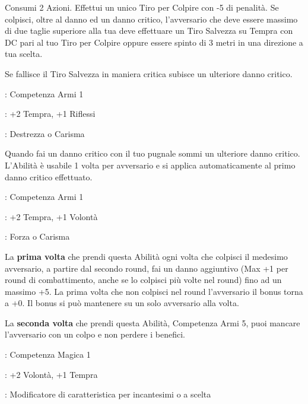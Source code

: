 \begin{multicols}{2}
Consumi 2 Azioni. Effettui un unico Tiro per Colpire con -5 di penalità.
Se colpisci, oltre al danno ed un danno critico, l'avversario che deve essere massimo di due taglie superiore alla tua deve effettuare un Tiro Salvezza su Tempra con DC pari al tuo Tiro per Colpire oppure essere spinto di 3 metri in una direzione a tua scelta.

Se fallisce il Tiro Salvezza in maniera critica subisce un ulteriore danno critico.

\begin{description}[noitemsep, topsep=0pt, parsep=0pt, partopsep=0pt, leftmargin=0cm, labelwidth=2.5cm]
    \item[\textbf{Requisito}]: Competenza Armi 1
    \item[\textbf{Tiri Salvezza}]: +2 Tempra, +1 Riflessi
    \item[\textbf{Caratteristica}]: Destrezza o Carisma
\end{description}

Quando fai un danno critico con il tuo pugnale sommi un ulteriore danno critico. L'Abilità è usabile 1 volta per avversario e si applica automaticamente al primo danno critico effettuato.

\begin{description}[noitemsep, topsep=0pt, parsep=0pt, partopsep=0pt, leftmargin=0cm, labelwidth=2.5cm]
    \item[\textbf{Requisito}]: Competenza Armi 1
    \item[\textbf{Tiri Salvezza}]: +2 Tempra, +1 Volontà
    \item[\textbf{Caratteristica}]: Forza o Carisma
\end{description}

La \textbf{prima volta} che prendi questa Abilità ogni volta che colpisci il medesimo avversario, a partire dal secondo round, fai un danno aggiuntivo (Max +1 per round di combattimento, anche se lo colpisci più volte nel round) fino ad un massimo +5. La prima volta che non colpisci nel round l'avversario il bonus torna a +0. Il bonus si può mantenere su un solo avversario alla volta.

La \textbf{seconda volta} che prendi questa Abilità, Competenza Armi 5, puoi mancare l'avversario con un colpo e non perdere i benefici.

\begin{description}[noitemsep, topsep=0pt, parsep=0pt, partopsep=0pt, leftmargin=0cm, labelwidth=2.5cm]
    \item[\textbf{Requisito}]: Competenza Magica 1
    \item[\textbf{Tiri Salvezza}]: +2 Volontà, +1 Tempra
    \item[\textbf{Caratteristica}]: Modificatore di caratteristica per incantesimi o a scelta
\end{description}


\end{multicols}

